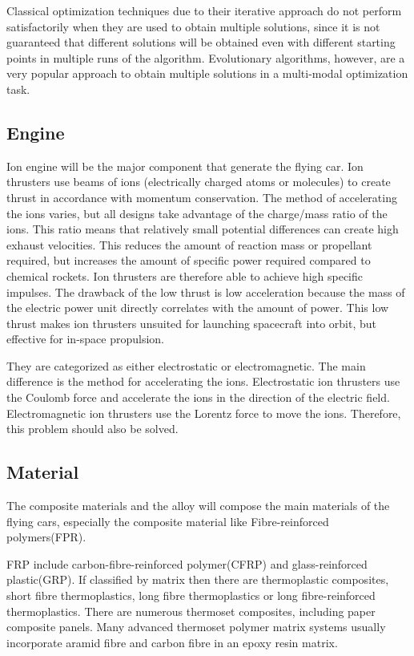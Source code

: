 Classical optimization techniques due to their iterative approach do not perform satisfactorily when they are used to obtain multiple solutions, since it is not guaranteed that different solutions will be obtained even with different starting points in multiple runs of the algorithm. Evolutionary algorithms, however, are a very popular approach to obtain multiple solutions in a multi-modal optimization task.

{\color{red}{插图}}

\subsection{Engine}

Ion engine will be the major component that generate the flying car. Ion thrusters use beams of ions (electrically charged atoms or molecules) to create thrust in accordance with momentum conservation. The method of accelerating the ions varies, but all designs take advantage of the charge/mass ratio of the ions. This ratio means that relatively small potential differences can create high exhaust velocities. This reduces the amount of reaction mass or propellant required, but increases the amount of specific power required compared to chemical rockets. Ion thrusters are therefore able to achieve high specific impulses. The drawback of the low thrust is low acceleration because the mass of the electric power unit directly correlates with the amount of power. This low thrust makes ion thrusters unsuited for launching spacecraft into orbit, but effective for in-space propulsion. 

They are categorized as either electrostatic or electromagnetic. The main difference is the method for accelerating the ions. Electrostatic ion thrusters use the Coulomb force and accelerate the ions in the direction of the electric field. Electromagnetic ion thrusters use the Lorentz force to move the ions. Therefore, this problem should also be solved.

\subsection{Material}

The composite materials and the alloy will compose the main materials of the flying cars, especially the composite material like Fibre-reinforced polymers(FPR).

FRP include carbon-fibre-reinforced polymer(CFRP) and glass-reinforced plastic(GRP). If classified by matrix then there are thermoplastic composites, short fibre thermoplastics, long fibre thermoplastics or long fibre-reinforced thermoplastics. There are numerous thermoset composites, including paper composite panels. Many advanced thermoset polymer matrix systems usually incorporate aramid fibre and carbon fibre in an epoxy resin matrix.

